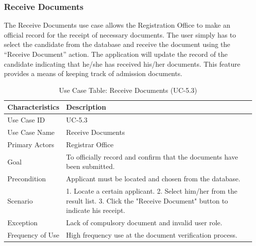 \subsubsection{Receive Documents}
The Receive Documents use case allows the Registration Office to make an official record for the receipt of necessary documents. The user simply has to select the candidate from the database and receive the document using the “Receive Document” action. The application will update the record of the candidate indicating that he/she has received his/her documents. This feature provides a means of keeping track of admission documents.
\begin{table}[H]
    \centering
    \small
    \renewcommand{\arraystretch}{1.4}
    \caption{Use Case Table: Receive Documents (UC-5.3)} %
    \label{tab:receive-documents-registrar}
    \begin{tabularx}{\textwidth}{|l|X|}
        \hline
        \rowcolor[gray]{0.9} {Characteristics} & {Description} \\ \hline
        Use Case ID & UC-5.3 \\ \hline
        Use Case Name & Receive Documents \\ \hline
        Primary Actors & Registrar Office \\ \hline
        Goal & To officially record and confirm that the documents have been submitted. \\ \hline
        Precondition & Applicant must be located and chosen from the database. \\ \hline
        Scenario & 1. Locate a certain applicant. 2. Select him/her from the result list. 3. Click the "Receive Document" button to indicate his receipt. \\ \hline
        Exception & Lack of compulsory document and invalid user role. \\ \hline
        Frequency of Use & High frequency use at the document verification process. \\ \hline
    \end{tabularx}
\end{table}
\FloatBarrier